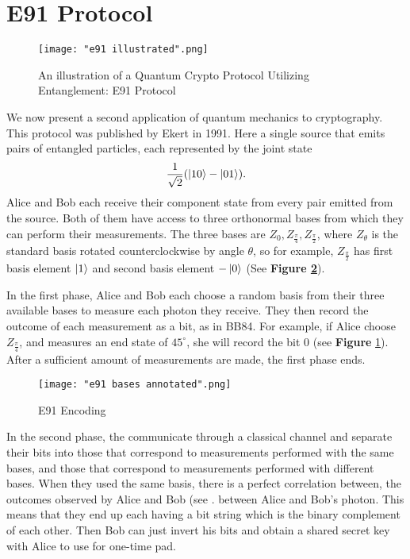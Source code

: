 \section{E91 Protocol} \label{section: e91}
\begin{figure}[h]
    \centering
    \texttt{[image: "e91 illustrated".png]}
    \caption{An illustration of a Quantum Crypto Protocol Utilizing Entanglement: E91 Protocol \protect\footnotemark}
    \label{fig:E91 Illustrated}
\end{figure}


We now present a second application of quantum mechanics to cryptography.  This protocol was published by Ekert in 1991\cite{Ekert1991}.  Here a single source that emits pairs of entangled particles, each represented by the joint state 
$$\frac{1}{\sqrt{2}}(\ket{10}-\ket{01}).$$
Alice and Bob each receive their component state from every pair emitted from the source. Both of them have access to three orthonormal bases from which they can perform their measurements.  The three bases are $Z_0, Z_{\frac{\pi}{4}}, Z_{\frac{\pi}{2}}$, where $Z_\theta$ is the standard basis rotated counterclockwise by angle $\theta$, so for example, $Z_{\frac{\pi}{2}}$ has first basis element $\ket{1}$ and second basis element $-\ket{0}$ (See \textbf{Figure \ref{fig:e91 encoding}}).


In the first phase, Alice and Bob each choose a random basis from their three available bases to measure each photon they receive. They then record the outcome of each measurement as a bit, as in BB84.  For example, if Alice choose $Z_{\frac{\pi}{4}}$, and measures an end state of $45^\circ$, she will record the bit $0$ (see {\bf{Figure}} \ref{fig:E91 Illustrated}).  After a sufficient amount of measurements are made, the first phase ends.  

\begin{figure}[h]
    \centering
    \texttt{[image: "e91 bases annotated".png]}
    \caption{E91 Encoding}
    \label{fig:e91 encoding}
\end{figure}



In the second phase, the communicate through a classical channel and separate their bits into those that correspond to measurements performed with the same bases, and those that correspond to measurements performed with different bases.  When they used the same basis, there is a perfect correlation between, the outcomes observed by Alice and Bob (see . between Alice and Bob's photon. This means that they end up each having a bit string which is the binary complement of each other. Then Bob can just invert his bits and obtain a shared secret key with Alice to use for one-time pad. 

